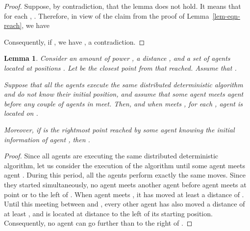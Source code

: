 \documentclass{article}
\newtheorem{lemma}{Lemma}
\begin{document}
\begin{proof}
Suppose, by contradiction, that the lemma does not hold. It means that
for each , . Therefore, in view of the claim from the proof of Lemma~\ref{lem-eqn-reach}, we have


Consequently, if , we have 
, 
a contradiction.
\end{proof}

\begin{lemma}\label{lem-online-gap}
Consider an amount of power , a distance , and a set
 of  agents located at positions
.  Let  be the closest point from  that 
reached. Assume that .

Suppose that all the agents execute the same distributed deterministic algorithm
and do not know their initial position, and assume that some agent  meets agent  before any couple of agents 
in  meet. Then, 
and when  meets , for each , agent  is
located on .

Moreover, if  is the rightmost point reached by
some agent knowing the initial information of agent , then
.
\end{lemma}


\begin{proof}
Since all agents are executing the same distributed deterministic algorithm, let
us consider the execution of the algorithm until some agent meets
agent . During this period, all the agents perform exactly the
same moves. Since they started simultaneously, no agent meets another agent before agent 
meets  at point  or to the left of . When agent 
meets , it has moved at least a distance of . Until this
meeting between  and , every other agent has also moved a
distance of at least , and is located at distance  to the left
of its starting position. Consequently, no agent can go further than
 to the right of .
\end{proof}
\end{document}
